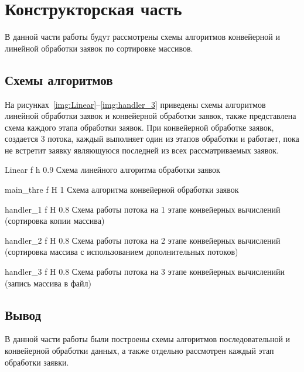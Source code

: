 \chapter{Конструкторская часть}
В данной части работы будут рассмотрены схемы алгоритмов конвейерной и линейной обработки заявок по сортировке массивов.







\section{Схемы алгоритмов}
На рисунках~\ref{img:Linear}--\ref{img:handler_3} приведены схемы алгоритмов линейной обработки заявок и конвейерной обработки заявок, также представлена схема
каждого этапа обработки заявок. При конвейерной обработке заявок, создается 3 потока, каждый выполняет один из этапов обработки и работает, пока не встретит заявку являющуюся последней из всех рассматриваемых заявок.

{Linear} %
{f} %
{h} %
{0.9\textwidth} %
{Схема линейного алгоритма обработки заявок} %



{main_thre} %
{f} %
{H} %
{1\textwidth} %
{Схема алгоритма конвейерной обработки заявок} %


{handler_1} %
{f} %
{H} %
{0.8\textwidth} %
{Схема работы потока на 1 этапе конвейерных вычислений (сортировка копии массива)} %

{handler_2} %
{f} %
{H} %
{0.8\textwidth} %
{Схема работы потока на 2 этапе конвейерных вычислений (сортировка массива с использованием дополнительных потоков)} %

{handler_3} %
{f} %
{H} %
{0.8\textwidth} %
{Схема работы потока на 3 этапе конвейерных вычисленийи (запись массива в файл)} %






\section*{Вывод}
В данной части работы были построены схемы алгоритмов последовательной и конвейерной обработки данных, а также отдельно рассмотрен каждый этап обработки заявки.









